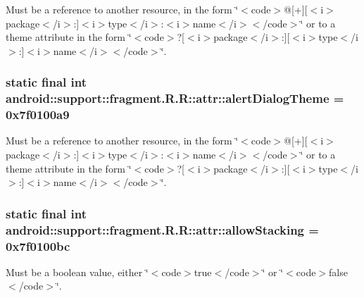 Must be a reference to another resource, in the form \char`\"{}$<$code$>$@\mbox{[}+\mbox{]}\mbox{[}$<$i$>$package$<$/i$>$:\mbox{]}$<$i$>$type$<$/i$>$:$<$i$>$name$<$/i$>$$<$/code$>$\char`\"{} or to a theme attribute in the form \char`\"{}$<$code$>$?\mbox{[}$<$i$>$package$<$/i$>$:\mbox{]}\mbox{[}$<$i$>$type$<$/i$>$:\mbox{]}$<$i$>$name$<$/i$>$$<$/code$>$\char`\"{}. \hypertarget{classandroid_1_1support_1_1fragment_1_1_r_1_1attr_1a414ba80ff613d6a443cb75345a54cd}{
\subsubsection[{alertDialogTheme}]{\setlength{\rightskip}{0pt plus 5cm}static final int android::support::fragment.R.R::attr::alertDialogTheme = 0x7f0100a9}}
\label{classandroid_1_1support_1_1fragment_1_1_r_1_1attr_1a414ba80ff613d6a443cb75345a54cd}


Must be a reference to another resource, in the form \char`\"{}$<$code$>$@\mbox{[}+\mbox{]}\mbox{[}$<$i$>$package$<$/i$>$:\mbox{]}$<$i$>$type$<$/i$>$:$<$i$>$name$<$/i$>$$<$/code$>$\char`\"{} or to a theme attribute in the form \char`\"{}$<$code$>$?\mbox{[}$<$i$>$package$<$/i$>$:\mbox{]}\mbox{[}$<$i$>$type$<$/i$>$:\mbox{]}$<$i$>$name$<$/i$>$$<$/code$>$\char`\"{}. \hypertarget{classandroid_1_1support_1_1fragment_1_1_r_1_1attr_fb6bebe03d636cb257b95d52429bea33}{
\subsubsection[{allowStacking}]{\setlength{\rightskip}{0pt plus 5cm}static final int android::support::fragment.R.R::attr::allowStacking = 0x7f0100bc}}
\label{classandroid_1_1support_1_1fragment_1_1_r_1_1attr_fb6bebe03d636cb257b95d52429bea33}


Must be a boolean value, either \char`\"{}$<$code$>$true$<$/code$>$\char`\"{} or \char`\"{}$<$code$>$false$<$/code$>$\char`\"{}. 

